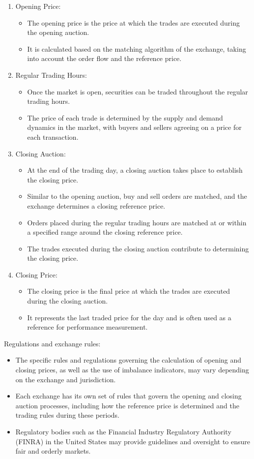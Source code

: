 \documentclass[11pt]{article}
\begin{document}
\begin{enumerate}
\item Opening Price:
\begin{itemize}
\item The opening price is the price at which the trades are executed during the opening auction.
\item It is calculated based on the matching algorithm of the exchange,
taking into account the order flow and the reference price.
\end{itemize}

\item Regular Trading Hours:
\begin{itemize}
\item Once the market is open, securities can be traded throughout the regular trading hours.
\item The price of each trade is determined by the supply and demand dynamics in the market,
with buyers and sellers agreeing on a price for each transaction.
\end{itemize}

\item Closing Auction:
\begin{itemize}
\item At the end of the trading day, a closing auction takes place to establish the closing price.
\item Similar to the opening auction, buy and sell orders are matched, and the exchange determines a closing reference price.
\item Orders placed during the regular trading hours are matched at or
within a specified range around the closing reference price.
\item The trades executed during the closing auction contribute to determining the closing price.
\end{itemize}

\item Closing Price:
\begin{itemize}
\item The closing price is the final price at which the trades are executed during the closing auction.
\item It represents the last traded price for the day and
is often used as a reference for performance measurement.
\end{itemize}
\end{enumerate}

Regulations and exchange rules:
\begin{itemize}
\item The specific rules and regulations governing the calculation of opening and closing prices,
as well as the use of imbalance indicators, may vary depending on the exchange and jurisdiction.
\item Each exchange has its own set of rules that govern the opening and closing auction processes,
including how the reference price is determined and the trading rules during these periods.
\item Regulatory bodies such as the Financial Industry Regulatory Authority (FINRA) in the United States may
provide guidelines and oversight to ensure fair and orderly markets.
\end{itemize}
\end{document}
